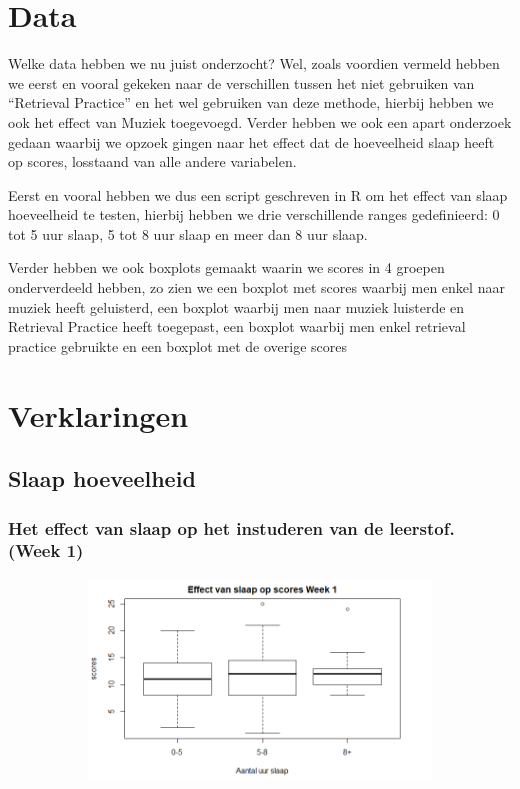 \documentclass{hogent-article}
\begin{document}
\section{Data}

Welke data hebben we nu juist onderzocht? Wel, zoals voordien vermeld hebben we eerst en vooral gekeken naar de verschillen tussen het niet gebruiken van “Retrieval Practice” en het wel gebruiken van deze methode, hierbij hebben we ook het effect van Muziek toegevoegd. Verder hebben we ook een apart onderzoek gedaan waarbij we opzoek gingen naar het effect dat de hoeveelheid slaap heeft op scores, losstaand van alle andere variabelen.\\
\par
\noindent
Eerst en vooral hebben we dus een script geschreven in R om het effect van slaap hoeveelheid te testen, hierbij hebben we drie verschillende ranges gedefinieerd: 0 tot 5 uur slaap, 5 tot 8 uur slaap en meer dan 8 uur slaap.\\
\par
\noindent
Verder hebben we ook boxplots gemaakt waarin we scores in 4 groepen onderverdeeld hebben, zo zien we een boxplot met scores waarbij men enkel naar muziek heeft geluisterd, een boxplot waarbij men naar muziek luisterde en Retrieval Practice heeft toegepast, een boxplot waarbij men enkel retrieval practice gebruikte en een boxplot met de overige scores
\section{Verklaringen}

\subsection{Slaap hoeveelheid}

\subsubsection{Het effect van slaap op het instuderen van de leerstof. (Week 1)}

\begin{figure}[H]
	\begin{subfigure}{0.45\textwidth}
		\includegraphics[width=\linewidth]{slaapGraph1}
	\end{subfigure}
\end{figure}
\end{document}
